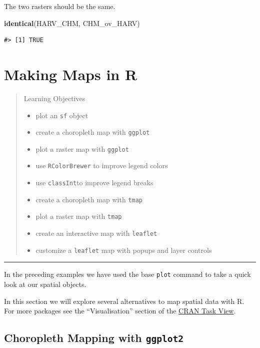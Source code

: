 \documentclass[
]{book}
\newenvironment{Shaded}{\begin{snugshade}}{\end{snugshade}}
\newcommand{\FunctionTok}[1]{\textcolor[rgb]{0.13,0.29,0.53}{\textbf{#1}}}
\newcommand{\NormalTok}[1]{#1}
\providecommand{\tightlist}{%
  \setlength{\itemsep}{0pt}\setlength{\parskip}{0pt}}
\begin{document}
The two rasters should be the same.

\begin{Shaded}
\begin{Highlighting}[]
\FunctionTok{identical}\NormalTok{(HARV\_CHM, CHM\_ov\_HARV)}
\end{Highlighting}
\end{Shaded}

\begin{verbatim}
#> [1] TRUE
\end{verbatim}

\chapter{Making Maps in R}\label{mapping}

\begin{quote}
Learning Objectives

\begin{itemize}
\tightlist
\item
  plot an \texttt{sf} object
\item
  create a choropleth map with \texttt{ggplot}
\item
  plot a raster map with \texttt{ggplot}
\item
  use \texttt{RColorBrewer} to improve legend colors
\item
  use \texttt{classInt}to improve legend breaks
\item
  create a choropleth map with \texttt{tmap}
\item
  plot a raster map with \texttt{tmap}
\item
  create an interactive map with \texttt{leaflet}
\item
  customize a \texttt{leaflet} map with popups and layer controls
\end{itemize}
\end{quote}

\begin{center}\rule{0.5\linewidth}{0.5pt}\end{center}

In the preceding examples we have used the base \texttt{plot} command to take a quick look at our spatial objects.

In this section we will explore several alternatives to map spatial data with R. For more packages see the ``Visualisation'' section of the \href{https://cran.r-project.org/web/views/Spatial.html}{CRAN Task View}.

\section{\texorpdfstring{Choropleth Mapping with \texttt{ggplot2}}{Choropleth Mapping with ggplot2}}\label{choropleth-mapping-with-ggplot2}
\end{document}
